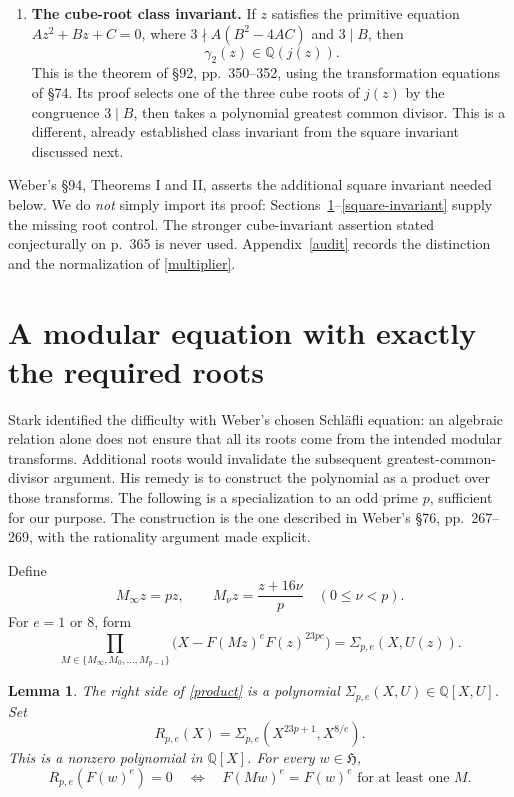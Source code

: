 \documentclass[11pt]{article}
\newtheorem{lemma}[theorem]{Lemma}
\newcommand{\Q}{\mathbb Q}
\newcommand{\HH}{\mathfrak H}
\begin{document}
\begin{enumerate}
\item \textbf{The cube-root class invariant.}
If \(z\) satisfies the primitive equation
\(Az^2+Bz+C=0\), where \(3\nmid A(B^2-4AC)\) and \(3\mid B\),
then
\begin{equation}\label{gamma-invariant}
 \gamma_2(z)\in\Q(j(z)).
\end{equation}
This is the theorem of \S92, pp.~350--352, using the transformation
equations of \S74. Its proof selects one of the three cube roots
of \(j(z)\) by the congruence \(3\mid B\), then takes a polynomial
greatest common divisor. This is a different, already established
class invariant from the square invariant discussed next.
\end{enumerate}

Weber's \S94, Theorems I and II, asserts the additional square
invariant needed below. We do \emph{not} simply import its proof:
Sections~\ref{repair}--\ref{square-invariant} supply the missing
root control. The stronger cube-invariant assertion stated
conjecturally on p.~365 is never used. Appendix~\ref{audit}
records the distinction and the normalization of
\eqref{multiplier}.

\section{A modular equation with exactly the required roots}\label{repair}

Stark \cite[\S3]{stark} identified the difficulty with Weber's chosen
Schl\"afli equation: an algebraic relation alone does not ensure that
all its roots come from the intended modular transforms. Additional
roots would invalidate the subsequent greatest-common-divisor
argument. His remedy is to construct the polynomial as a product over
those transforms. The following is a specialization to an odd prime
\(p\), sufficient for our purpose. The construction is the one
described in Weber's \S76, pp.~267--269, with the rationality argument
made explicit.

Define
\[
 M_\infty z=pz,\qquad M_\nu z=\frac{z+16\nu}{p}
       \quad(0\le\nu<p).
\]
For \(e=1\) or \(8\), form
\begin{equation}\label{product}
 \prod_{M\in\{M_\infty,M_0,\ldots,M_{p-1}\}}
 \bigl(X-F(Mz)^eF(z)^{23pe}\bigr)
       =\Sigma_{p,e}(X,U(z)).
\end{equation}

\begin{lemma}\label{product-lemma}
The right side of \eqref{product} is a polynomial
\(\Sigma_{p,e}(X,U)\in\Q[X,U]\). Set
\[
 R_{p,e}(X)=\Sigma_{p,e}(X^{23p+1},X^{8/e}).
\]
This is a nonzero polynomial in \(\Q[X]\). For every
\(w\in\HH\),
\begin{equation}\label{root-test}
 R_{p,e}(F(w)^e)=0
 \quad\Longleftrightarrow\quad
 F(Mw)^e=F(w)^e\text{ for at least one }M.
\end{equation}
\end{lemma}
\end{document}
